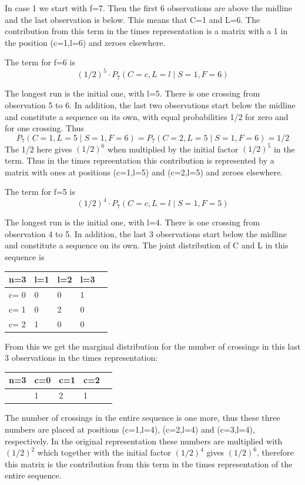 In case 1 we start with f=7. Then the first 6 observations are above the midline and the last observation is below. This means that C=1 and L=6. The contribution from this term in the times representation is a matrix with a 1 in the position (c=1,l=6) and zeroes elsewhere. 

The term for f=6 is $$(1/2)^5 \cdot   P_7 (C=c, L=l \mid S=1,F=6)$$

The longest run is the initial one, with l=5. There is one crossing from observation 5 to 6. In addition, the last two observations start below the midline and constitute a sequence on its own, with equal probabilities 1/2 for zero and for one crossing. Thus $$P_7 (C=1, L=5 \mid S=1,F=6)=P_7 (C=2, L=5 \mid S=1,F=6)=1/2$$
The 1/2 here gives $(1/2)^6$ when multiplied by the initial factor $(1/2)^5$ in the term. Thus in the times repreentation this contribution is represented by a matrix with ones at positions (c=1,l=5) and (c=2,l=5) and zeroes elsewhere. 

The term for f=5 is $$(1/2)^4 \cdot   P_7 (C=c, L=l \mid S=1,F=5)$$

The longest run is the initial one, with l=4. There is one crossing from observation 4 to 5. In addition, the last 3 observations start below the midline and constitute a sequence on its own. The joint distribution of C and L in this sequence is 

\begin{tabular}{l | l l l l}
\hline
n=3&l=1&l=2&l=3\\
\hline
c= 0& 0& 0& 1\\
c= 1& 0& 2& 0\\
c= 2& 1& 0& 0\\
\hline
\end{tabular}

From this we get the marginal distribution for the number of crossings in this last 3 observations in the times representation:

\begin{tabular}{l | l l l l}
\hline
n=3&c=0&c=1&c=2\\
\hline
& 1& 2& 1\\
\hline
\end{tabular}


The number of crossings in the entire sequence is one more, thus these three numbers are placed at positions (c=1,l=4), (c=2,l=4) and (c=3,l=4), respectively. In the original representation these numbers are multiplied with $(1/2)^2$ which together with the initial factor $(1/2)^4$ gives $(1/2)^6$, therefore this matrix is the contribution from this term in the times representation of the entire sequence.

